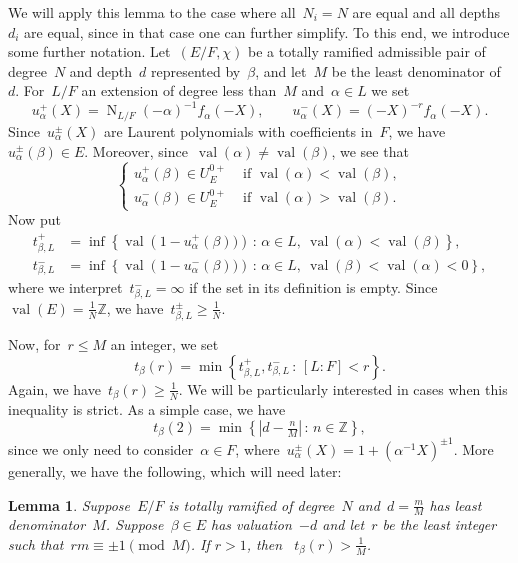 \documentclass[12pt]{amsart}
\newcommand{\BZ}{\mathbb {Z}}
\renewcommand{\mid}{\,:\,}
\newcommand{\N}{\operatorname{N}}
\newcommand{\val}{\operatorname{val}}
\newtheorem{lem}[thm]{Lemma}
\newtheorem{lem}[equation]{Lemma}
\begin{document}
We will apply this lemma to the case where all~$N_i=N$ are equal and all depths~$d_i$ are equal, since in that case one can further simplify. To this end, we introduce some further notation. Let~$(E/F,\chi)$ be a totally ramified admissible pair of degree~$N$ and depth~$d$ represented by~$\beta$, and let~$M$ be the least denominator of~$d$. For~$L/F$ an extension of degree less than~$M$ and~$\alpha\in L$ we set
\[
u^+_\alpha(X)= \N_{L/F}(-\alpha)^{-1} f_\alpha(-X), \qquad u^-_\alpha(X) = (-X)^{-r} f_\alpha(-X).
\]
Since~$u^\pm_\alpha(X)$ are Laurent polynomials with coefficients in~$F$, we have~$u^\pm_\alpha(\beta)\in E$. Moreover, since~$\val(\alpha)\ne\val(\beta)$, we see that
\[
\begin{cases} u^+_\alpha(\beta) \in U_E^{0+} &\text{ if }\val(\alpha)<\val(\beta),\\
u^-_\alpha(\beta) \in U_E^{0+} &\text{ if }\val(\alpha)>\val(\beta). 
\end{cases}
\]
Now put
\begin{align*}
t^+_{\beta,L} &= \inf\left\{ \val\left(1-u^+_\alpha(\beta))\right) \mid \alpha\in L,\ \val(\alpha)<\val(\beta)\right\}, \\[5pt]
t^-_{\beta,L} &= \inf\left\{ \val\left(1- u^-_\alpha(\beta))\right) \mid \alpha\in L,\ \val(\beta)<\val(\alpha)<0\right\},
\end{align*}
where we interpret~$t^-_{\beta,L}=\infty$ if the set in its definition is empty. Since~$\val(E)=\frac 1N\mathbb{Z}$, we have~$t^\pm_{\beta,L}\ge \frac 1N$. 

Now, for~$r\le M$ an integer, we set
\[
t_\beta(r) = \min\left\{ t^+_{\beta,L}, t^-_{\beta,L} \mid [L:F]< r\right\}.
\]
Again, we have~$t_\beta(r)\ge \frac 1N$. We will be particularly interested in cases when this inequality is strict. As a simple case, we have
\begin{equation}\label{eqn:tb2}
t_\beta(2) = \min\left\{\left|d-\tfrac nM\right| \mid n\in\BZ\right\},
\end{equation}
since we only need to consider~$\alpha\in F$, where~$u^\pm_\alpha(X)=1+(\alpha^{-1}X)^{\pm 1}$. More generally, we have the following, which will need later:

\begin{lem}\label{lem:tbeta}
Suppose~$E/F$ is totally ramified of degree~$N$ and~$d=\frac mM$ has least denominator~$M$. Suppose~$\beta\in E$ has valuation~$-d$ and let~$r$ be the least integer such that~$rm\equiv \pm 1\pmod M$. If $r > 1$, then ~$t_\beta(r)>\frac 1M$.
\end{lem}
\end{document}
